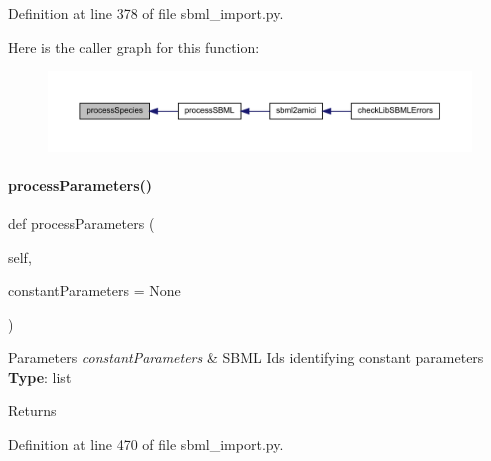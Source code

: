 Definition at line 378 of file sbml\+\_\+import.\+py.

Here is the caller graph for this function\+:
\nopagebreak
\begin{figure}[H]
\begin{center}
\leavevmode
\includegraphics[width=350pt]{classamici_1_1sbml__import_1_1_sbml_importer_a4912a89bf86ec8e0c1d9758b8090e327_icgraph}
\end{center}
\end{figure}
\mbox{\label{classamici_1_1sbml__import_1_1_sbml_importer_a26d072114efe1fec695cc4030c64e1ea}} 
\paragraph{\texorpdfstring{process\+Parameters()}{processParameters()}}
{\footnotesize\ttfamily def process\+Parameters (\begin{DoxyParamCaption}\item[{}]{self,  }\item[{}]{constant\+Parameters = {\ttfamily None} }\end{DoxyParamCaption})}


\begin{DoxyParams}{Parameters}
{\em constant\+Parameters} & S\+B\+ML Ids identifying constant parameters ~\newline
{\bfseries Type}\+: list\\
\hline
\end{DoxyParams}
\begin{DoxyReturn}{Returns}

\end{DoxyReturn}


Definition at line 470 of file sbml\+\_\+import.\+py.

